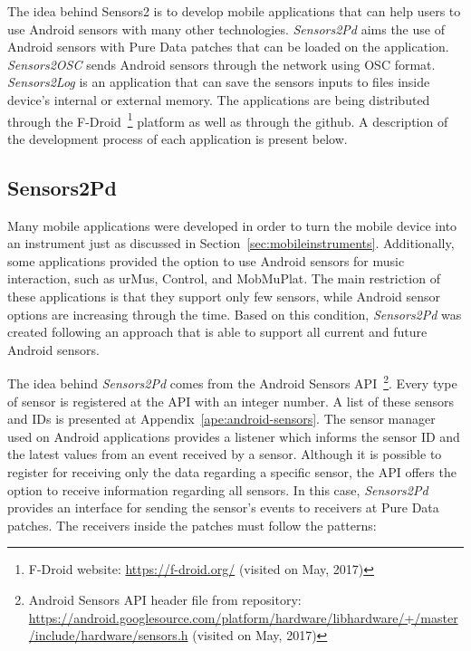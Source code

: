 The idea behind Sensors2 is to develop mobile applications that can help users to use Android sensors with many other technologies.
\textit{Sensors2Pd} aims the use of Android sensors with Pure Data patches that can be loaded on the application.
\textit{Sensors2OSC} sends Android sensors through the network using OSC format.
\textit{Sensors2Log} is an application that can save the sensors inputs to files inside device's internal or external memory.
The applications are being distributed through the F-Droid~\footnote{F-Droid website: \url{https://f-droid.org/} (visited on May, 2017)} platform as well as through the github.
A description of the development process of each application is present below.

\subsection*{Sensors2Pd}
\label{apesubsec:appsensors2pd}

Many mobile applications were developed in order to turn the mobile device into an instrument just as discussed in Section~\ref{sec:mobileinstruments}.
Additionally, some applications provided the option to use Android sensors for music interaction, such as urMus, Control, and MobMuPlat.
The main restriction of these applications is that they support only few sensors, while Android sensor options are increasing through the time.
Based on this condition, \textit{Sensors2Pd} was created following an approach that is able to support all current and future Android sensors.

The idea behind \textit{Sensors2Pd} comes from the Android Sensors API~\footnote{Android Sensors API header file from repository: \url{https://android.googlesource.com/platform/hardware/libhardware/+/master/include/hardware/sensors.h} (visited on May, 2017)}.
Every type of sensor is registered at the API with an integer number.
A list of these sensors and IDs is presented at Appendix~\ref{ape:android-sensors}.
The sensor manager used on Android applications provides a listener which informs the sensor ID and the latest values from an event received by a sensor. %
Although it is possible to register for receiving only the data regarding a specific sensor, the API offers the option to receive information regarding all sensors.
In this case, \textit{Sensors2Pd} provides an interface for sending the sensor's events to receivers at Pure Data patches.
The receivers inside the patches must follow the patterns:

